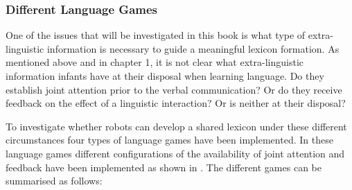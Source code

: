 \subsubsection{Different Language Games}

One of the issues that will be investigated in this book is what type of extra-linguistic information is necessary to guide a meaningful lexicon formation. As mentioned above and in chapter 1, it is not clear what extra-linguistic information infants have at their disposal when learning language. Do they establish joint attention prior to the verbal communication? Or do they receive feedback on the effect of a linguistic interaction? Or is neither at their disposal? 

To investigate whether robots can develop a shared lexicon under these different circumstances four types of language games have been implemented. In these language games different configurations of the availability of joint attention and feedback have been implemented as shown in . The different games can be summarised as follows:

